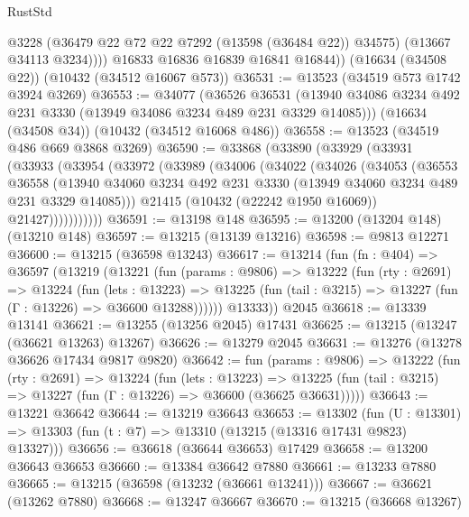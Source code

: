 \begin{lexlean}{RustStd}
\begin{coremodule}
              @3228
              (@36479 @22 @72 @22 @7292 (@13598 (@36484 @22)) @34575)
              (@13667 @34113 @3234))))
        @16833
        @16836
        @16839
        @16841
        @16844))
    (@16634 (@34508 @22))
    (@10432 (@34512 @16067 @573))
@36531 := @13523 (@34519 @573 @1742 @3924 @3269)
@36553 := @34077
    (@36526
      @36531
      (@13940 @34086 @3234 @492 @231 @3330 (@13949 @34086 @3234 @489 @231 @3329 @14085)))
    (@16634 (@34508 @34))
    (@10432 (@34512 @16068 @486))
@36558 := @13523 (@34519 @486 @669 @3868 @3269)
@36590 := @33868
    (@33890
      (@33929
        (@33931
          (@33933
            (@33954
              (@33972
                (@33989
                  (@34006
                    (@34022
                      (@34026
                        (@34053
                          (@36553
                            @36558
                            (@13940
                              @34060
                              @3234
                              @492
                              @231
                              @3330
                              (@13949 @34060 @3234 @489 @231 @3329 @14085)))
                          @21415
                          (@10432 (@22242 @1950 @16069))
                          @21427)))))))))))
@36591 := @13198 @148
@36595 := @13200 (@13204 @148) (@13210 @148)
@36597 := @13215 (@13139 @13216)
@36598 := @9813 @12271
@36600 := @13215 (@36598 @13243)
@36617 := @13214
    (fun (fn : @404) =>
    @36597
      (@13219
        (@13221
          (fun (params : @9806) =>
          @13222
            (fun (rty : @2691) =>
            @13224
              (fun (lets : @13223) =>
              @13225 (fun (tail : @3215) => @13227 (fun (Γ : @13226) => @36600 @13288))))))
        @13333))
    @2045
@36618 := @13339 @13141
@36621 := @13255 (@13256 @2045) @17431
@36625 := @13215 (@13247 (@36621 @13263) @13267)
@36626 := @13279 @2045
@36631 := @13276 (@13278 @36626 @17434 @9817 @9820)
@36642 := fun (params : @9806) =>
  @13222
    (fun (rty : @2691) =>
    @13224
      (fun (lets : @13223) =>
      @13225 (fun (tail : @3215) => @13227 (fun (Γ : @13226) => @36600 (@36625 @36631)))))
@36643 := @13221 @36642
@36644 := @13219 @36643
@36653 := @13302
    (fun (U : @13301) => @13303 (fun (t : @7) => @13310 (@13215 (@13316 @17431 @9823) @13327)))
@36656 := @36618 (@36644 @36653) @17429
@36658 := @13200 @36643 @36653
@36660 := @13384 @36642 @7880
@36661 := @13233 @7880
@36665 := @13215 (@36598 (@13232 (@36661 @13241)))
@36667 := @36621 (@13262 @7880)
@36668 := @13247 @36667
@36670 := @13215 (@36668 @13267)

\end{coremodule}
\end{lexlean}
